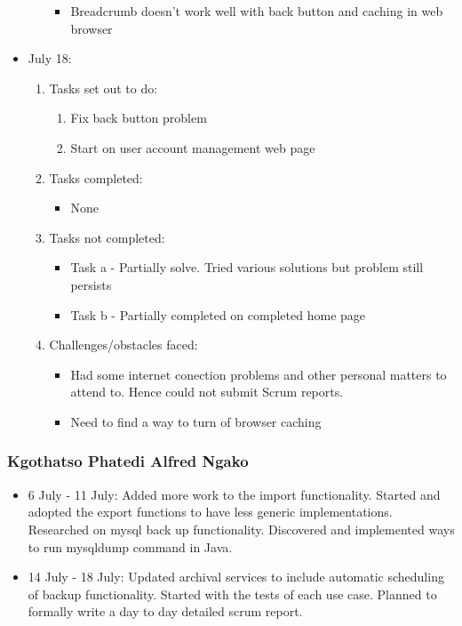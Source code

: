 \documentclass[12pt]{article}
\begin{document}
\begin{itemize}
\begin{enumerate}
\begin{itemize}
			\item Breadcrumb doesn't work well with back button and caching in web browser
		\end{itemize}			
	\end{enumerate}
	\item July 18:
	\begin{enumerate}
		\item Tasks set out to do:
		\begin{enumerate}
			\item Fix back button problem
			\item Start on user account management web page			
		\end{enumerate}
		\item Tasks completed:
		\begin{itemize}
			\item None								
		\end{itemize}
			\item Tasks not completed:
		\begin{itemize}
			\item Task a - Partially solve. Tried various solutions but problem still persists
			\item Task b - Partially completed on completed home page
		\end{itemize}
		\item Challenges/obstacles faced:
		\begin{itemize}
			\item Had some internet conection problems and other personal matters to attend to. Hence could not submit Scrum reports.
			\item Need to find a way to turn of browser caching
		\end{itemize}			
	\end{enumerate}
\end{itemize}

\subsubsection{Kgothatso Phatedi Alfred Ngako}
\begin{itemize}	
	\item 6 July - 11 July: Added more work to the import functionality. Started and adopted the export functions to have less generic implementations. Researched on mysql back up functionality. Discovered and implemented ways to run mysqldump command in Java.
	\item 14  July - 18 July: Updated archival services to include automatic scheduling of backup functionality. Started with the tests of each use case. Planned to formally write a day to day detailed scrum report.
\end{itemize}
\end{document}

